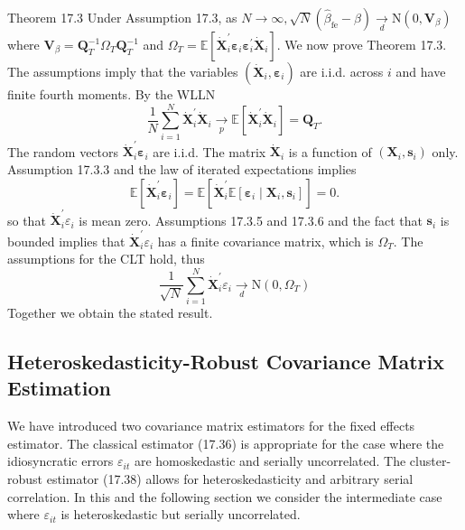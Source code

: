 \documentclass[10pt]{article}
\begin{document}
Theorem 17.3 Under Assumption 17.3, as $N \rightarrow \infty, \sqrt{N}\left(\widehat{\beta}_{\mathrm{fe}}-\beta\right) \underset{d}{\longrightarrow} \mathrm{N}\left(0, \boldsymbol{V}_{\beta}\right)$ where $\boldsymbol{V}_{\beta}=\boldsymbol{Q}_{T}^{-1} \Omega_{T} \boldsymbol{Q}_{T}^{-1}$ and $\Omega_{T}=\mathbb{E}\left[\dot{\boldsymbol{X}}_{i}^{\prime} \boldsymbol{\varepsilon}_{i} \boldsymbol{\varepsilon}_{i}^{\prime} \dot{\boldsymbol{X}}_{i}\right]$. We now prove Theorem 17.3. The assumptions imply that the variables $\left(\dot{\boldsymbol{X}}_{i}, \boldsymbol{\varepsilon}_{i}\right)$ are i.i.d. across $i$ and have finite fourth moments. By the WLLN
$$
\frac{1}{N} \sum_{i=1}^{N} \dot{\boldsymbol{X}}_{i}^{\prime} \dot{\boldsymbol{X}}_{i} \underset{p}{\longrightarrow} \mathbb{E}\left[\dot{\boldsymbol{X}}_{i}^{\prime} \dot{\boldsymbol{X}}_{i}\right]=\boldsymbol{Q}_{T} .
$$
The random vectors $\dot{\boldsymbol{X}}_{i}^{\prime} \boldsymbol{\varepsilon}_{i}$ are i.i.d. The matrix $\dot{\boldsymbol{X}}_{i}$ is a function of $\left(\boldsymbol{X}_{i}, \boldsymbol{s}_{i}\right)$ only. Assumption 17.3.3 and the law of iterated expectations implies
$$
\mathbb{E}\left[\dot{\boldsymbol{X}}_{i}^{\prime} \boldsymbol{\varepsilon}_{i}\right]=\mathbb{E}\left[\dot{\boldsymbol{X}}_{i}^{\prime} \mathbb{E}\left[\boldsymbol{\varepsilon}_{i} \mid \boldsymbol{X}_{i}, \boldsymbol{s}_{i}\right]\right]=0 .
$$
so that $\dot{\boldsymbol{X}}_{i}^{\prime} \varepsilon_{i}$ is mean zero. Assumptions 17.3.5 and 17.3.6 and the fact that $\boldsymbol{s}_{i}$ is bounded implies that $\dot{\boldsymbol{X}}_{i}^{\prime} \varepsilon_{i}$ has a finite covariance matrix, which is $\Omega_{T}$. The assumptions for the CLT hold, thus
$$
\frac{1}{\sqrt{N}} \sum_{i=1}^{N} \dot{\boldsymbol{X}}_{i}^{\prime} \varepsilon_{i} \underset{d}{\longrightarrow} \mathrm{N}\left(0, \Omega_{T}\right)
$$
Together we obtain the stated result.

\subsection{Heteroskedasticity-Robust Covariance Matrix Estimation}
We have introduced two covariance matrix estimators for the fixed effects estimator. The classical estimator (17.36) is appropriate for the case where the idiosyncratic errors $\varepsilon_{i t}$ are homoskedastic and serially uncorrelated. The cluster-robust estimator (17.38) allows for heteroskedasticity and arbitrary serial correlation. In this and the following section we consider the intermediate case where $\varepsilon_{i t}$ is heteroskedastic but serially uncorrelated.
\end{document}
